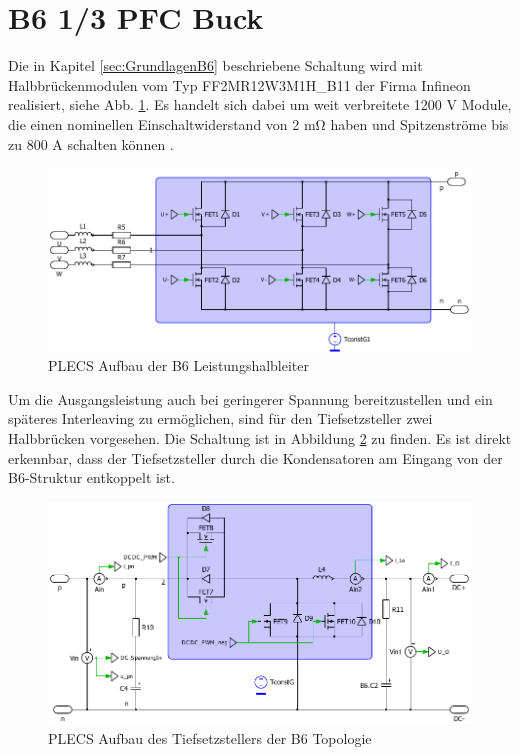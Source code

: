 \section{B6 1/3 PFC Buck}
Die in Kapitel \ref{sec:GrundlagenB6} beschriebene Schaltung wird mit Halbbrückenmodulen vom Typ FF2MR12W3M1H\_B11 der Firma Infineon realisiert, siehe Abb. \ref{fig:plecsb6}. Es handelt sich dabei um weit verbreitete 1200 \si{\volt} Module, die einen nominellen Einschaltwiderstand von 2 \si{\milli \ohm} haben und Spitzenströme bis zu 800 \si{\ampere} schalten können \cite{IFAGFF2}.
\begin{figure}[H]
	\centering
	\includegraphics[width=0.9\linewidth]{content/Grafiken/PLECS_B6}
	\caption{PLECS Aufbau der B6 Leistungshalbleiter}
	\label{fig:plecsb6}
\end{figure}
 Um die Ausgangsleistung auch bei geringerer Spannung bereitzustellen und ein späteres Interleaving zu ermöglichen, sind für den Tiefsetzsteller zwei Halbbrücken vorgesehen. Die Schaltung ist in Abbildung \ref{fig:plecsb6buck} zu finden. Es ist direkt erkennbar, dass der Tiefsetzsteller durch die Kondensatoren am Eingang von der B6-Struktur entkoppelt ist.
 \begin{figure}[H]
 	\centering
 	\includegraphics[width=0.9\linewidth]{content/Grafiken/PLECS_B6Buck}
 	\caption{PLECS Aufbau des Tiefsetzstellers der B6 Topologie}
 	\label{fig:plecsb6buck}
 \end{figure}
 

